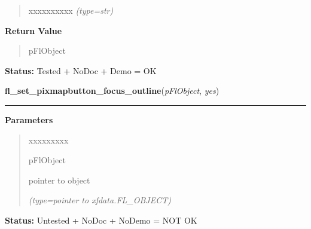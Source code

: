 \begin{boxedminipage}{\funcwidth}
\begin{quote}
\begin{Ventry}{xxxxxxxxxx}
            {\it (type=str)}

        \end{Ventry}

      \end{quote}

      \textbf{Return Value}
    \vspace{-1ex}

      \begin{quote}
      pFlObject

      \end{quote}

\textbf{Status:} Tested + NoDoc + Demo = OK



    \end{boxedminipage}

    \label{xformslib:flbutton:fl_set_pixmapbutton_focus_outline}

    \vspace{0.5ex}

\hspace{.8\funcindent}\begin{boxedminipage}{\funcwidth}

    \raggedright \textbf{fl\_set\_pixmapbutton\_focus\_outline}(\textit{pFlObject}, \textit{yes})

    \vspace{-1.5ex}

    \rule{\textwidth}{0.5\fboxrule}
\setlength{\parskip}{2ex}
\setlength{\parskip}{1ex}
      \textbf{Parameters}
      \vspace{-1ex}

      \begin{quote}
        \begin{Ventry}{xxxxxxxxx}

          \item[pFlObject]

          pointer to object

            {\it (type=pointer to xfdata.FL\_OBJECT)}

        \end{Ventry}

      \end{quote}

\textbf{Status:} Untested + NoDoc + NoDemo = NOT OK



    \end{boxedminipage}

